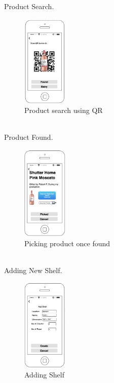 \pagebreak
Product Search.
\begin{figure}[hbt!]
                	\centering
                   	\includegraphics[width=0.19\textwidth]{images/search}
                    \caption{Product search using QR}
                \end{figure}
\\Product Found.
\begin{figure}[hbt!]
                	\centering
                   	\includegraphics[width=0.19\textwidth]{images/pick}
                    \caption{Picking product once found}
                \end{figure}
\pagebreak
\\Adding New Shelf.
\begin{figure}[hbt!]
                	\centering
                   	\includegraphics[width=0.19\textwidth]{images/shelf}
                    \caption{Adding Shelf}
                \end{figure}
